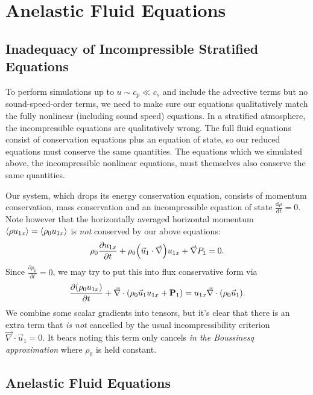 \documentclass[11pt,
        usenames, %
        dvipsnames %
    ]{report}
\newcommand*{\rd}[2]{\frac{\mathrm{d}#1}{\mathrm{d}#2}}
\newcommand*{\pd}[2]{\frac{\partial#1}{\partial#2}}
\newcommand*{\bm}[1]{\boldsymbol{\mathbf{#1}}}
\DeclarePairedDelimiter\ev{\langle}{\rangle}
\DeclarePairedDelimiter\p{\lparen}{\rparen}
\begin{document}
\chapter{Anelastic Fluid Equations}

\section{Inadequacy of Incompressible Stratified Equations}

To perform simulations up to $u \sim c_p \ll c_s$ and include the advective
terms but no sound-speed-order terms, we need to make sure our equations
qualitatively match the fully nonlinear (including sound speed) equations.
In a stratified atmosphere, the incompressible equations are qualitatively
wrong. The full fluid equations consist of conservation equations plus an
equation of state, so our reduced equations must conserve the same quantities.
The equations which we simulated above, the incompressible nonlinear equations,
must themselves also conserve the same quantities.

Our system, which drops its energy conservation equation, consists of momentum
conservation, mass conservation and an incompressible equation of state
$\rd{\rho}{t} = 0$. Note however that the horizontally averaged horizontal
momentum $\ev*{\rho u_{1x}} = \ev*{\rho_0 u_{1x}}$ is \emph{not} conserved by
our above equations:
\begin{equation}
    \rho_0 \pd{u_{1x}}{t} + \rho_0 \p*{\vec{u}_1 \cdot \vec{\nabla}} u_{1x}
        + \vec{\nabla}P_1 = 0.
\end{equation}
Since $\pd{\rho_0}{t} = 0$, we may try to put this into flux conservative form
via
\begin{equation}
    \pd{(\rho_0 u_{1x})}{t} + \vec{\nabla} \cdot
        \p*{\rho_0 \vec{u}_1 u_{1x} + \bm{P}_1}
        = u_{1x} \vec{\nabla} \cdot \p*{\rho_0 \vec{u}_1}.
\end{equation}
We combine some scalar gradients into tensors, but it's clear that there is an
extra term that \emph{is not} cancelled by the usual incompressibility criterion
$\vec{\nabla} \cdot \vec{u}_1 = 0$. It bears noting this term only cancels
\emph{in the Boussinesq approximation} where $\rho_0$ is held constant.

\section{Anelastic Fluid Equations}
\end{document}
